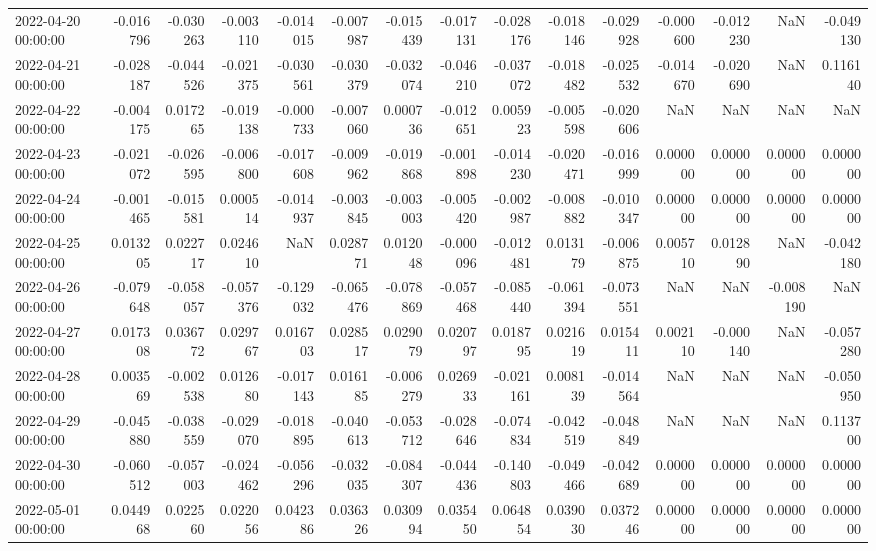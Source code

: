 \begin{tabular}{lrrrrrrrrrrrrrr}
2022-04-20 00:00:00 & -0.016796 & -0.030263 & -0.003110 & -0.014015 & -0.007987 & -0.015439 & -0.017131 & -0.028176 & -0.018146 & -0.029928 & -0.000600 & -0.012230 & NaN & -0.049130 \\
2022-04-21 00:00:00 & -0.028187 & -0.044526 & -0.021375 & -0.030561 & -0.030379 & -0.032074 & -0.046210 & -0.037072 & -0.018482 & -0.025532 & -0.014670 & -0.020690 & NaN & 0.116140 \\
2022-04-22 00:00:00 & -0.004175 & 0.017265 & -0.019138 & -0.000733 & -0.007060 & 0.000736 & -0.012651 & 0.005923 & -0.005598 & -0.020606 & NaN & NaN & NaN & NaN \\
2022-04-23 00:00:00 & -0.021072 & -0.026595 & -0.006800 & -0.017608 & -0.009962 & -0.019868 & -0.001898 & -0.014230 & -0.020471 & -0.016999 & 0.000000 & 0.000000 & 0.000000 & 0.000000 \\
2022-04-24 00:00:00 & -0.001465 & -0.015581 & 0.000514 & -0.014937 & -0.003845 & -0.003003 & -0.005420 & -0.002987 & -0.008882 & -0.010347 & 0.000000 & 0.000000 & 0.000000 & 0.000000 \\
2022-04-25 00:00:00 & 0.013205 & 0.022717 & 0.024610 & NaN & 0.028771 & 0.012048 & -0.000096 & -0.012481 & 0.013179 & -0.006875 & 0.005710 & 0.012890 & NaN & -0.042180 \\
2022-04-26 00:00:00 & -0.079648 & -0.058057 & -0.057376 & -0.129032 & -0.065476 & -0.078869 & -0.057468 & -0.085440 & -0.061394 & -0.073551 & NaN & NaN & -0.008190 & NaN \\
2022-04-27 00:00:00 & 0.017308 & 0.036772 & 0.029767 & 0.016703 & 0.028517 & 0.029079 & 0.020797 & 0.018795 & 0.021619 & 0.015411 & 0.002110 & -0.000140 & NaN & -0.057280 \\
2022-04-28 00:00:00 & 0.003569 & -0.002538 & 0.012680 & -0.017143 & 0.016185 & -0.006279 & 0.026933 & -0.021161 & 0.008139 & -0.014564 & NaN & NaN & NaN & -0.050950 \\
2022-04-29 00:00:00 & -0.045880 & -0.038559 & -0.029070 & -0.018895 & -0.040613 & -0.053712 & -0.028646 & -0.074834 & -0.042519 & -0.048849 & NaN & NaN & NaN & 0.113700 \\
2022-04-30 00:00:00 & -0.060512 & -0.057003 & -0.024462 & -0.056296 & -0.032035 & -0.084307 & -0.044436 & -0.140803 & -0.049466 & -0.042689 & 0.000000 & 0.000000 & 0.000000 & 0.000000 \\
2022-05-01 00:00:00 & 0.044968 & 0.022560 & 0.022056 & 0.042386 & 0.036326 & 0.030994 & 0.035450 & 0.064854 & 0.039030 & 0.037246 & 0.000000 & 0.000000 & 0.000000 & 0.000000 \\

\end{tabular}
